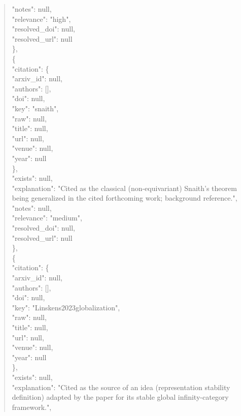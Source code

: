 \documentclass[11pt]{article}
\begin{document}
\begin{quote}
      "notes": null,\\
      "relevance": "high",\\
      "resolved\_doi": null,\\
      "resolved\_url": null\\
    \},\\
    \{\\
      "citation": \{\\
        "arxiv\_id": null,\\
        "authors": [],\\
        "doi": null,\\
        "key": "snaith",\\
        "raw": null,\\
        "title": null,\\
        "url": null,\\
        "venue": null,\\
        "year": null\\
      \},\\
      "exists": null,\\
      "explanation": "Cited as the classical (non-equivariant) Snaith's theorem being generalized in the cited forthcoming work; background reference.",\\
      "notes": null,\\
      "relevance": "medium",\\
      "resolved\_doi": null,\\
      "resolved\_url": null\\
    \},\\
    \{\\
      "citation": \{\\
        "arxiv\_id": null,\\
        "authors": [],\\
        "doi": null,\\
        "key": "Linskens2023globalization",\\
        "raw": null,\\
        "title": null,\\
        "url": null,\\
        "venue": null,\\
        "year": null\\
      \},\\
      "exists": null,\\
      "explanation": "Cited as the source of an idea (representation stability definition) adapted by the paper for its stable global infinity-category framework.",\\

\end{quote}
\end{document}
